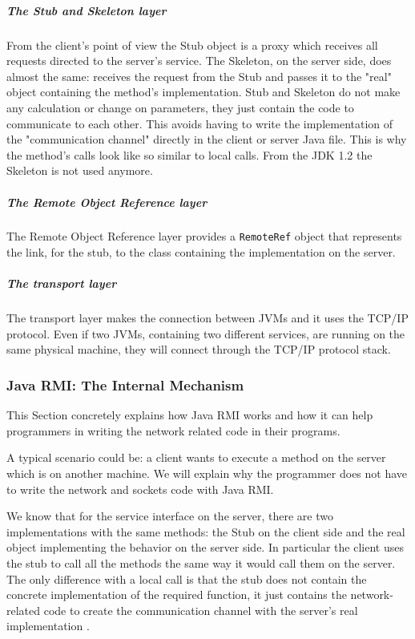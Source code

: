 \subparagraph{The Stub and Skeleton layer}
From the client's point of view the Stub object is a proxy which receives all requests directed to the server's service. The Skeleton, on the server side, does almost the same: receives the request from the Stub and passes it to the "real" object containing the method's implementation. Stub and Skeleton do not make any calculation or change on parameters, they just contain the code to communicate to each other. This avoids having to write the implementation of the "communication channel" directly in the client or server Java file. This is why the method's calls look like so similar to local calls. From the JDK 1.2 the Skeleton is not used anymore.
\subparagraph{The Remote Object Reference layer}
The Remote Object Reference layer provides a \verb|RemoteRef| object that represents the link, for the stub, to the class containing the implementation on the server. 
\subparagraph{The transport layer}
The transport layer makes the connection between JVMs and it uses the TCP/IP protocol. Even if two JVMs, containing two different services, are running on the same physical machine, they will connect through the TCP/IP protocol stack. 


\subsubsection{Java RMI: The Internal Mechanism}
\label{JavaRMIinternalMechanism}

This Section concretely explains how Java RMI works and how it can help programmers in writing the network related code in their programs.

A typical scenario could be: a client wants to execute a method on the server which is on another machine. We will explain why the programmer does not have to write the network and sockets code with Java RMI.

We know that for the service interface on the server, there are two implementations with the same methods: the Stub on the client side and the real object implementing the behavior on the server side. In particular the client uses the stub to call all the methods the same way it would call them on the server. The only difference with a local call is that the stub does not contain the concrete implementation of the required function, it just contains the network-related code to create the communication channel with the server's real implementation \cite{RMI-art4}.

